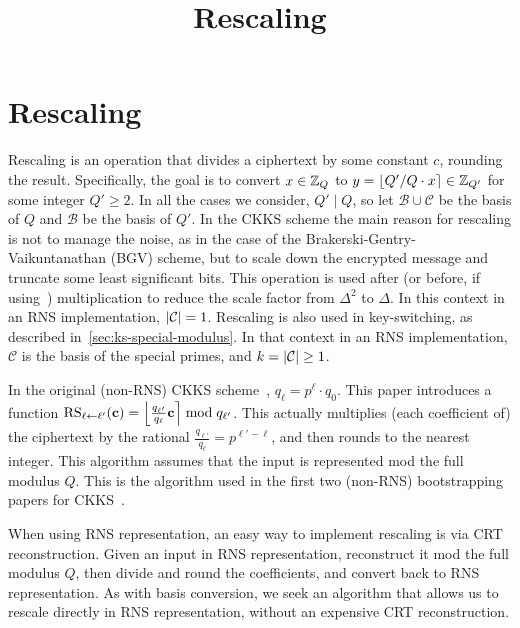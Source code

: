 \documentclass[../../fheimpl.tex]{subfiles}
\begin{document}
	\ifcompileasbook
	\else
	\title{Rescaling}
	\hypersetup{pageanchor=false}
	\maketitle
	\listoffixmes
	\tableofcontents
	\compileasbooktrue
	\hypersetup{pageanchor=true}
	\fi

\section{Rescaling}
\label{sec:rescaling}
Rescaling is an operation that divides a ciphertext by some constant $c$, rounding the result. Specifically, the goal is to convert $x\in \Z_Q$ to $y=\round{Q'/Q\cdot x}\in\Z_{Q'}$ for some integer $Q' \ge 2$. In all the cases we consider, $Q' \mid Q$, so let $\mathcal{B}\cup\mathcal{C}$ be the basis of $Q$ and $\mathcal{B}$ be the basis of $Q'$.
In the CKKS scheme the main reason for rescaling is not to manage the noise, as in the case of the Brakerski-Gentry-Vaikuntanathan (BGV) scheme, but to scale down the encrypted message and truncate some least significant bits. This operation is used after (or before, if using~\cite{cryptoeprint:2020/1118}) multiplication to reduce the scale factor from $\Delta^2$ to $\Delta$. In this context in an RNS implementation, $\abs{\mathcal{C}}=1$. Rescaling is also used in key-switching, as described in~\cref{sec:ks-special-modulus}. In that context in an RNS implementation, $\mathcal{C}$ is the basis of the special primes, and $k=\abs{\mathcal{C}}\ge 1$.

In the original (non-RNS) CKKS scheme~\cite{cryptoeprint:2016/421}, $q_\ell=p^\ell\cdot q_0$. This paper introduces a function $\mathrm{RS}_{\ell\leftarrow \ell'}(\mathbf{c}) = \round*{\frac{q_{\ell'}}{q_\ell}\mathbf{c}} \bmod q_{\ell'}$. This actually multiplies (each coefficient of) the ciphertext by the rational $\frac{q_{\ell'}}{q_\ell}=p^{\ell'-\ell}$, and then rounds to the nearest integer. This algorithm assumes that the input is represented mod the full modulus $Q$. This is the algorithm used in the first two (non-RNS) bootstrapping papers for CKKS~\cite{cryptoeprint:2018/153, cryptoeprint:2018/1043}.

When using RNS representation, an easy way to implement rescaling is via CRT reconstruction. Given an input in RNS representation, reconstruct it mod the full modulus $Q$, then divide and round the coefficients, and convert back to RNS representation. As with basis conversion, we seek an algorithm that allows us to rescale directly in RNS representation, without an expensive CRT reconstruction.
\end{document}
